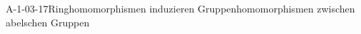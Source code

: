
\begin{REM}{A-1-03-17}{Ringhomomorphismen induzieren Gruppenhomomorphismen zwischen abelschen Gruppen}
\end{REM}
